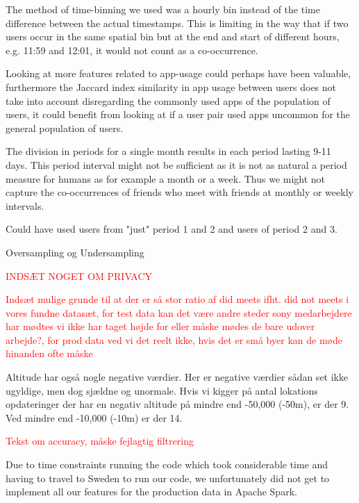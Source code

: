 The method of time-binning we used was a hourly bin instead of the time difference between the actual timestamps. This is limiting in the way that if two users occur in the same spatial bin but at the end and start of different hours, e.g. 11:59 and 12:01, it would not count as a co-occurrence.

Looking at more features related to app-usage could perhaps have been valuable, furthermore the Jaccard index similarity in app usage between users does not take into account disregarding the commonly used apps of the population of users, it could benefit from looking at if a user pair used apps uncommon for the general population of users.

The division in periods for a single month results in each period lasting 9-11 days. This period interval might not be sufficient as it is not as natural a period measure for humans as for example a month or a week. Thus we might not capture the co-occurrences of friends who meet with friends at monthly or weekly intervals.

Could have used users from "just" period 1 and 2 and users of period 2 and 3.

Oversampling og Undersampling

\textcolor{red}{INDSÆT NOGET OM PRIVACY}

\textcolor{red}{Indsæt mulige grunde til at der er så stor ratio af did meets ifht. did not meets i vores fundne datasæt, for test data kan det være andre steder sony medarbejdere har mødtes vi ikke har taget højde for eller måske mødes de bare udover arbejde?, for prod data ved vi det reelt ikke, hvis det er små byer kan de møde hinanden ofte måske}


Altitude har også nogle negative værdier. Her er negative værdier sådan set ikke ugyldige, men dog sjældne og unormale. Hvis vi kigger på antal lokations opdateringer der har en negativ altitude på mindre end -50,000 (-50m), er der 9. Ved mindre end -10,000 (-10m) er der 14.



\textcolor{red}{Tekst om accuracy, måske fejlagtig filtrering}

Due to time constraints running the code which took considerable time and having to travel to Sweden to run our code, we unfortunately did not get to implement all our features for the production data in Apache Spark.